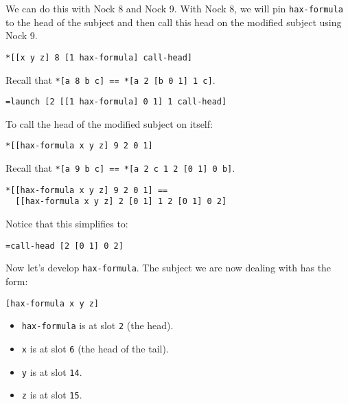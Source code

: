 \documentclass[twoside]{article}
\begin{document}
We can do this with Nock 8 and Nock 9. With Nock 8, we will pin \lstinline[style=inlinecode]{hax-formula} to the head of the subject and then call this head on the modified subject using Nock 9.

\begin{lstlisting}[style=listingblock]
*[[x y z] 8 [1 hax-formula] call-head]
\end{lstlisting}

Recall that \lstinline[style=inlinecode]{*[a 8 b c] == *[a 2 [b 0 1] 1 c]}.

\begin{lstlisting}[style=listingblock]
=launch [2 [[1 hax-formula] 0 1] 1 call-head]
\end{lstlisting}

To call the head of the modified subject on itself:

\begin{lstlisting}[style=listingblock]
*[[hax-formula x y z] 9 2 0 1]
\end{lstlisting}

Recall that \lstinline[style=inlinecode]{*[a 9 b c] == *[a 2 c 1 2 [0 1] 0 b]}.

\begin{lstlisting}[style=listingblock]
*[[hax-formula x y z] 9 2 0 1] ==
  [[hax-formula x y z] 2 [0 1] 1 2 [0 1] 0 2]
\end{lstlisting}

Notice that this simplifies to:

\begin{lstlisting}[style=listingblock]
=call-head [2 [0 1] 0 2]
\end{lstlisting}

Now let's develop \lstinline[style=inlinecode]{hax-formula}. The subject we are now dealing with has the form:

\begin{lstlisting}[style=listingblock]
[hax-formula x y z]
\end{lstlisting}

\begin{itemize}
  \item \lstinline[style=inlinecode]{hax-formula} is at slot \lstinline[style=inlinecode]{2} (the head).
  \item \lstinline[style=inlinecode]{x} is at slot \lstinline[style=inlinecode]{6} (the head of the tail).
  \item \lstinline[style=inlinecode]{y} is at slot \lstinline[style=inlinecode]{14}.
  \item \lstinline[style=inlinecode]{z} is at slot \lstinline[style=inlinecode]{15}.
\end{itemize}
\end{document}
